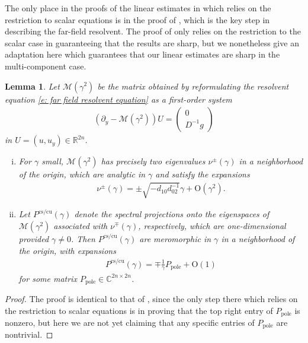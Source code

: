 \documentclass[11pt]{article}
\newcommand{\R}{\mathbb{R}}
\newcommand{\C}{\mathbb{C}}
\newtheorem{lemma}[prop]{Lemma}
\numberwithin{equation}{section}
\numberwithin{prop}{section}
\begin{document}
The only place in the proofs of the linear estimates in \cite{CAMS, SIMA} which relies on the restriction to scalar equations is in the proof of \cite[Lemma 2.2]{SIMA}, which is the key step in describing the far-field resolvent. The proof of \cite[Lemma 2.2]{SIMA} only relies on the restriction to the scalar case in guaranteeing that the results are sharp, but we nonetheless give an adaptation here which guarantees that our linear estimates are sharp in the multi-component case. 
\begin{lemma}\label{l: center projections pole}
	Let $\mathcal{M}(\gamma^2)$ be the matrix obtained by reformulating the resolvent equation \eqref{e: far field resolvent equation} as a first-order system
	\begin{align}
	(\partial_y - \mathcal{M}(\gamma^2)) U = \begin{pmatrix} 0 \\ D^{-1} g \end{pmatrix} \label{e: far field resolvent eqn first order}
	\end{align}
	in $U = (u,u_y) \in \R^{2n}$. 
	
	\begin{enumerate}[i.]
		\item For $\gamma$ small, $\mathcal{M}(\gamma^2)$ has precisely two eigenvalues $\nu^\pm(\gamma)$ in a neighborhood of the origin, which are analytic in $\gamma$ and satisfy the expansions
		\begin{align}
		\nu^\pm(\gamma) = \pm \sqrt{-d_{10}d_{02}^{-1} } \gamma + \mathrm{O}(\gamma^2). 
		\end{align}
		\item Let $P^\mathrm{cs/cu}(\gamma)$ denote the spectral projections onto the eigenspaces of $\mathcal{M}(\gamma^2)$ associated with $\nu^\mp(\gamma)$, respectively, which are one-dimensional provided $\gamma \neq 0$. Then $P^\mathrm{cs/cu}(\gamma)$ are meromorphic in $\gamma$ in a neighborhood of the origin, with expansions
		\begin{align}
		P^\mathrm{cs/cu}(\gamma) = \mp \frac{1}{\gamma} P_\mathrm{pole} + \mathrm{O}(1) 
		\end{align}
		for some matrix $P_\mathrm{pole}\in \C^{2n \times 2n}$.
	\end{enumerate}
\end{lemma}
\begin{proof}
	The proof is identical to that of \cite[Lemma 2.2]{SIMA}, since the only step there which relies on the restriction to scalar equations is in proving that the top right entry of $P_\mathrm{pole}$ is nonzero, but here we are not yet claiming that any specific entries of $P_\mathrm{pole}$ are nontrivial. 
\end{proof}
\end{document}
